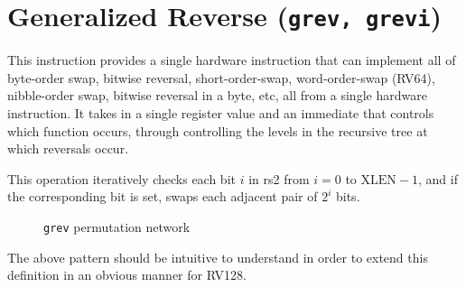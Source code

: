 \section{Generalized Reverse (\texttt{grev,\ grevi})}
\label{grev}

This instruction provides a single hardware instruction that can implement all
of byte-order swap, bitwise reversal, short-order-swap, word-order-swap
(RV64), nibble-order swap, bitwise reversal in a byte, etc, all from a single
hardware instruction. It takes in a single register value and an immediate that
controls which function occurs, through controlling the levels in the recursive
tree at which reversals occur.

This operation iteratively checks each bit $i$ in rs2 from $i=0$ to
$\textrm{XLEN}-1$, and if the corresponding bit is set, swaps each adjacent
pair of $2^i$ bits.

\begin{figure}[t]
\begin{center}

\end{center}
\caption{\texttt{grev} permutation network}
\label{permnet-grev}
\end{figure}



The above pattern should be intuitive to understand in order to extend
this definition in an obvious manner for RV128.

